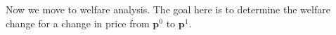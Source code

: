 Now we move to welfare analysis. The goal here is to determine the welfare change for a change in price from $\mathbf{p}^0$ to $\mathbf{p}^1$.

